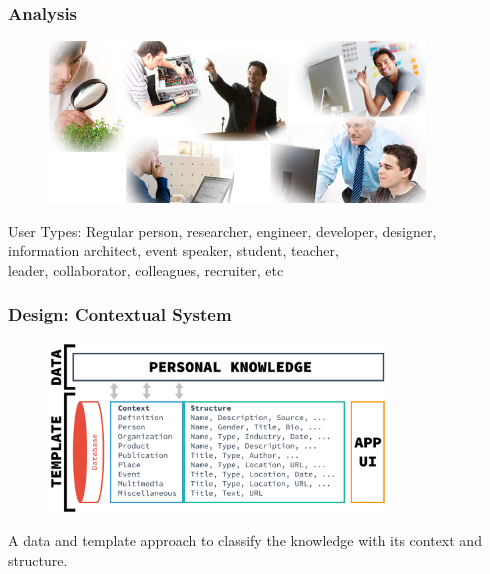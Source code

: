 \documentclass[10pt, compress]{beamer}
\begin{document}
\begin{frame}[fragile]
  \frametitle{Analysis}

  \begin{figure}[ht]
    \includegraphics[width=10cm]{include/users/types.jpg}
  \end{figure}

  \begin{block}{User Types:}
    Regular person, researcher, engineer, developer, designer,\\
    information architect, event speaker, student, teacher,\\
    leader, collaborator, colleagues, recruiter, etc
  \end{block}

\end{frame}


\begin{frame}[fragile]
  \frametitle{Design: Contextual System}
  \centering

  \begin{figure}[ht]
    \centering
    \includegraphics[width=9cm]{include/satellid-contextual.png}
    \label{fig:satellid-contextual}
  \end{figure}

  A data and template approach to classify the knowledge with its context and structure.

\end{frame}

\end{document}
